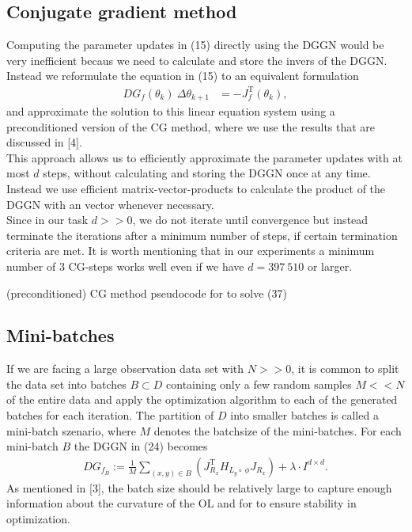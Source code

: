\documentclass[conference]{IEEEtran}
\begin{document}
\subsection{Conjugate gradient method}
\noindent
Computing the parameter updates in (15) directly using the DGGN would be very inefficient becaus we need to calculate and store the invers of the DGGN. Instead we reformulate the equation in (15) to an equivalent formulation
\begin{align}
DG_{f}(\theta_{k})\: \Delta\theta_{k+1} &= -J_{f}^{\mathrm{T}}(\theta_{k}),
\end{align}
and approximate the solution to this linear equation system using a preconditioned version of the CG method, where we use the results that are discussed in [4]. \\
This approach allows us to efficiently approximate the parameter updates with at most $d$ steps, without calculating and storing the DGGN once at any time. Instead we use efficient matrix-vector-products to calculate the product of the DGGN with an vector whenever necessary.\\
Since in our task $d>>0$, we do not iterate until convergence but instead terminate the iterations after a minimum number of steps, if certain termination criteria are met. It is worth mentioning that in our experiments a minimum number of 3 CG-steps works well even if we have $d=397\:510$ or larger. 

\begin{algorithm}
	\caption{(preconditioned) CG method pseudocode for to solve (37)}\label{alg:three}	
\end{algorithm}



\subsection{Mini-batches}
\noindent
If we are facing a large observation data set with $N>>0$, it is common to split the data set into batches $B\subset D$ containing only a few random samples $M<<N$ of the entire data and apply the optimization algorithm to each of the generated batches for each iteration. The partition of $D$ into smaller batches is called a mini-batch szenario, where $M$ denotes the batchsize of the mini-batches. For each mini-batch $B$ the DGGN in (24) becomes
\begin{align}
DG_{f_{B}} := \frac{1}{M}\sum_{(x, y)\in B}^{}\left(J_{R_{x}}^{\mathrm{T}}H_{L_{y}\circ\:\phi}J_{R_{x}}\right) + \lambda\cdot I^{d\times d}.
\end{align}
As mentioned in [3], the batch size should be relatively large to capture enough information about the curvature of the OL and for to ensure stability in optimization. 
\end{document}

